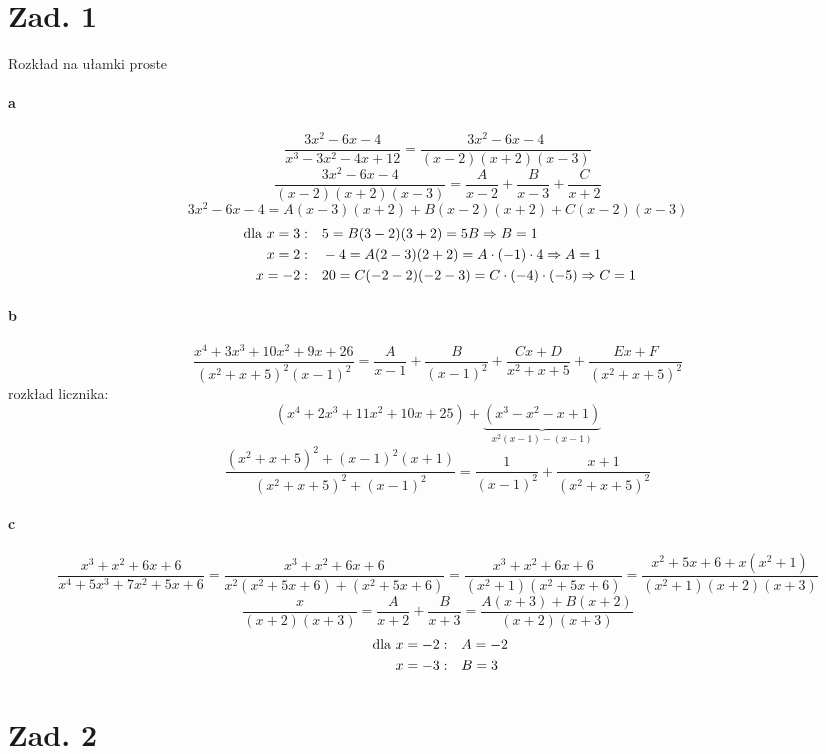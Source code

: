 \documentclass[a4paper,fleqn]{article}
\title{}
\author{}
\date{\today}
\begin{document}
	\section*{Zad. 1}
	Rozkład na ułamki proste

	\paragraph{a}
	\[ \frac{ 3x^2 - 6x - 4 }{ x^3 - 3x^2 - 4x + 12 } =
		\frac{ 3x^2 - 6x - 4 }{ (x-2)(x+2)(x-3) } \]
	\[ \frac{ 3x^2 - 6x - 4 }{ (x-2)(x+2)(x-3) } =
		\frac{A}{x-2} + \frac{B}{x-3} + \frac{C}{x+2} \]
	\[ 3x^2 - 6x - 4 = A(x-3)(x+2) + B(x-2)(x+2) + C(x-2)(x-3) \]
	\begin{align*}
		\text{ dla } x = 3:& \quad 5 = B(3-2)(3+2) = 5B \Rightarrow B = 1 \\
		x = 2:& \quad -4 = A(2-3)(2+2) = A \cdot (-1) \cdot 4 \Rightarrow A = 1 \\
		x = -2:& \quad 20 = C(-2-2)(-2-3) = C \cdot (-4) \cdot (-5) \Rightarrow C = 1
	\end{align*}

	\paragraph{b}
	\[ \frac{ x^4 + 3x^3 + 10x^2 + 9x + 26 }{ (x^2+x+5)^2 (x-1)^2} =
		\frac{A}{x-1} + \frac{B}{(x-1)^2} + \frac{Cx+D}{x^2+x+5} + \frac{Ex+F}{(x^2+x+5)^2} \]
	rozkład licznika:
	\[ (x^4+2x^3+11x^2+10x+25) + \underbrace{(x^3-x^2-x+1)}_{x^2(x-1) - (x-1)} \]
	\[ \frac{ (x^2+x+5)^2 + (x-1)^2(x+1) }{ (x^2+x+5)^2 + (x-1)^2 } =
		\frac{1}{(x-1)^2} + \frac{x+1}{(x^2+x+5)^2} \]

	\paragraph{c}
	\[ \frac{ x^3+x^2+6x+6 }{ x^4+5x^3+7x^2+5x+6 } =
		\frac{ x^3+x^2+6x+6 }{ x^2(x^2+5x+6)+(x^2+5x+6) } =
		\frac{ x^3+x^2+6x+6 }{ (x^2+1)(x^2+5x+6) } =
		\frac{ x^2+5x+6+x(x^2+1) }{ (x^2+1)(x+2)(x+3) } \]
	\[ \frac{x}{ (x+2)(x+3) } = \frac{A}{x+2} + \frac{B}{x+3} =
		\frac{ A(x+3) + B(x+2) }{ (x+2)(x+3) } \]
	\begin{align*}
		\text{ dla } x = -2:& \quad A = -2 \\
		x = -3:& \quad B = 3
	\end{align*}

	\section*{Zad. 2}
\end{document}
